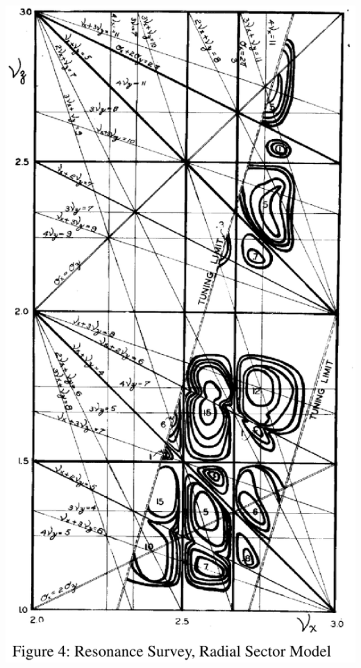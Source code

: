 \documentclass[12pt]{article}
\begin{document}
\begin{minipage}[b]{1.\linewidth}
{\begin{minipage}[b]{.3\linewidth}


 \includegraphics*[angle=90,width=.99\linewidth]{./figs_FFAG_introSlides/markV_tuneDiag.eps}

~~~~~~~~~~~~~~~~

~~~~~~~~~~~~~~~~

~~~~~~~~~~~~~~~~




\end{minipage}}
\end{minipage}
\end{document}
